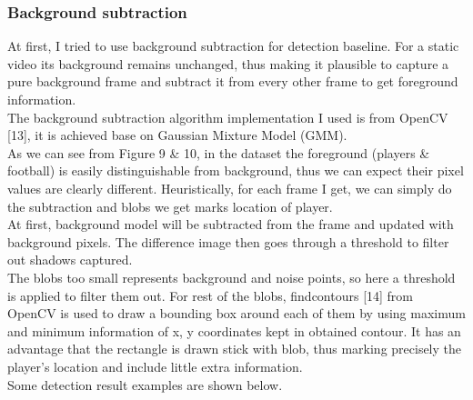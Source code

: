 \documentclass{article}
\begin{document}
\subsubsection{Background subtraction}
At first, I tried to use background subtraction for detection baseline. For a static video its background remains unchanged, thus making it plausible to capture a pure background frame and subtract it from every other frame to get foreground information.\\
The background subtraction algorithm implementation I used is from OpenCV [13], it is achieved base on Gaussian Mixture Model (GMM).  \\
As we can see from Figure 9 \& 10, in the dataset the foreground (players \& football) is easily distinguishable from background, thus we can expect their pixel values are clearly different. Heuristically, for each frame I get, we can simply do the subtraction and blobs we get marks location of player.\\
At first, background model will be subtracted from the frame and updated with background pixels. The difference image then goes through a threshold to filter out shadows captured.\\
The blobs too small represents background and noise points, so here a threshold is applied to filter them out. For rest of the blobs, findcontours [14] from OpenCV is used to draw a bounding box around each of them by using maximum and minimum information of x, y coordinates kept in obtained contour. It has an advantage that the rectangle is drawn stick with blob, thus marking precisely the player’s location and include little extra information.\\
Some detection result examples are shown below.\\
\end{document}
